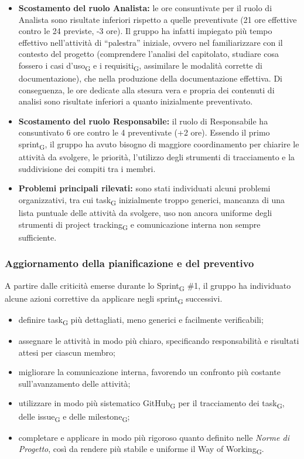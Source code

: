 ﻿\documentclass[a4paper, 10pt, colorlinks=true, linkcolor=black, urlcolor=blue, citecolor=blue, hidelinks]{article}
\begin{document}
\begin{itemize}
    \item \textbf{Scostamento del ruolo Analista:}
    le ore consuntivate per il ruolo di Analista sono risultate inferiori
    rispetto a quelle preventivate (21 ore effettive contro le 24 previste,
    -3 ore). Il gruppo ha infatti impiegato più tempo effettivo nell'attività
    di ``palestra'' iniziale, ovvero nel familiarizzare con il contesto del
    progetto (comprendere l'analisi del capitolato, studiare cosa fossero i
    casi d'uso\textsubscript{G} e i requisiti\textsubscript{G}, assimilare le
    modalità corrette di documentazione), che nella produzione della
    documentazione effettiva. Di conseguenza, le ore dedicate alla stesura
    vera e propria dei contenuti di analisi sono risultate inferiori a quanto
    inizialmente preventivato.

    \item \textbf{Scostamento del ruolo Responsabile:}
    il ruolo di Responsabile ha consuntivato 6 ore contro le 4 preventivate
    (+2 ore). Essendo il primo sprint\textsubscript{G}, il gruppo ha avuto
    bisogno di maggiore coordinamento per chiarire le attività da svolgere,
    le priorità, l'utilizzo degli strumenti di tracciamento e la suddivisione
    dei compiti tra i membri.

    \item \textbf{Problemi principali rilevati:}
    sono stati individuati alcuni problemi organizzativi, tra cui task\textsubscript{G} inizialmente troppo generici, mancanza di una lista puntuale delle attività da svolgere, uso non ancora uniforme degli strumenti di project tracking\textsubscript{G} e comunicazione interna non sempre sufficiente.
\end{itemize}

\subsubsection{Aggiornamento della pianificazione e del preventivo}
A partire dalle criticità emerse durante lo Sprint\textsubscript{G} \#1, il gruppo ha individuato alcune azioni correttive da applicare negli sprint\textsubscript{G} successivi.

\begin{itemize}
    \item definire task\textsubscript{G} più dettagliati, meno generici e facilmente verificabili;
    \item assegnare le attività in modo più chiaro, specificando responsabilità e risultati attesi per ciascun membro;
    \item migliorare la comunicazione interna, favorendo un confronto più costante sull'avanzamento delle attività;
    \item utilizzare in modo più sistematico GitHub\textsubscript{G} per il tracciamento dei task\textsubscript{G}, delle issue\textsubscript{G} e delle milestone\textsubscript{G};
    \item completare e applicare in modo più rigoroso quanto definito nelle \textit{Norme di Progetto}, così da rendere più stabile e uniforme il Way of Working\textsubscript{G}.
\end{itemize}
\end{document}

